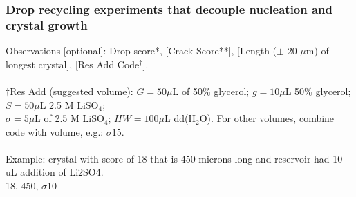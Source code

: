 \documentclass{report}
\begin{document}
\subsubsection*{Drop recycling experiments that decouple nucleation and crystal growth}

Observations [optional]: Drop score*, [Crack Score**], [Length ($\pm$ 20 $\mu$m) of longest crystal], [Res Add Code$^{\dagger}$]. \\
\vspace{1mm}\\
$\dagger$Res Add (suggested volume):  $G = 50 \mu$L of 50\% glycerol; $g = 10 \mu$L 50\% glycerol; $S = 50 \mu$L 2.5 M LiSO$_{4}$; \\
$\sigma = 5 \mu$L of 2.5 M LiSO$_{4}$;  $HW = 100 \mu$L dd(H$_{2}$O). For other volumes, combine code with volume, e.g.: $\sigma15$. \\
\vspace{1mm}\\
Example: crystal with score of 18 that is 450 microns long and reservoir had 10 uL addition of Li2SO4. \\
18, 450, $\sigma$10 \\
\vspace{3mm}
\end{document}
